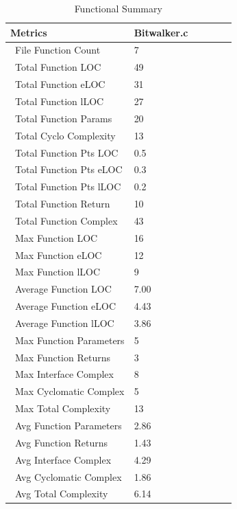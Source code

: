 \begin{longtable}{||p{}|p{}|p{}|p{}|p{}|p{}||}
  \caption{Functional Summary}\\
    \hline\hline
    \textbf{Metrics} & \textbf{Bitwalker.c}\\
    \hline\hline
    \endhead
    \hline\hline
    \endfoot
    \ File Function Count
& 7
    \\
    \hline
    \ Total Function LOC
& 49
    \\
    \hline
    \ Total Function eLOC
& 31
    \\
    \hline
    \ Total Function lLOC
& 27
    \\
    \hline
    \ Total Function Params
& 20
    \\
    \hline
    \ Total Cyclo Complexity
& 13
    \\
    \hline
    \ Total Function Pts LOC
& 0.5
    \\
    \hline
    \ Total Function Pts eLOC
& 0.3
    \\
    \hline
    \ Total Function Pts lLOC
& 0.2
    \\
    \hline
    \ Total Function Return
& 10
    \\
    \hline
    \ Total Function Complex
& 43
    \\
    \hline
    \ Max Function LOC
& 16
    \\
    \hline
    \ Max Function eLOC
& 12
    \\
    \hline
    \ Max Function lLOC
& 9
    \\
    \hline
    \ Average Function LOC
& 7.00
    \\
    \hline
    \ Average Function eLOC
& 4.43
    \\
    \hline
    \ Average Function lLOC
& 3.86
    \\
    \hline
    \ Max Function Parameters
& 5
    \\
    \hline
    \ Max Function Returns
& 3
    \\
    \hline
    \ Max Interface Complex
& 8
    \\
    \hline
    \ Max Cyclomatic Complex
& 5
    \\
    \hline
    \ Max Total Complexity
& 13
    \\
    \hline
    \ Avg Function Parameters
& 2.86
    \\
    \hline
    \ Avg Function Returns
& 1.43
    \\
    \hline
    \ Avg Interface Complex
& 4.29
    \\
    \hline
    \ Avg Cyclomatic Complex
& 1.86
    \\
    \hline
    \ Avg Total Complexity
& 6.14
    \\
    \hline
\end{longtable}

